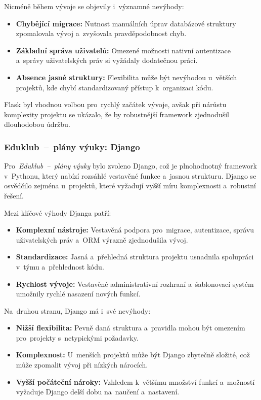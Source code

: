 \documentclass[male,czech,api_bc]{kitheses}
\begin{document}
Nicméně během vývoje se objevily i~významné nevýhody:
\begin{itemize}
	\item \textbf{Chybějící migrace:} Nutnost manuálních úprav databázové struktury zpomalovala vývoj a~zvyšovala pravděpodobnost chyb.
	\item \textbf{Základní správa uživatelů:} Omezené možnosti nativní autentizace a~správy uživatelských práv si vyžádaly dodatečnou práci.
	\item \textbf{Absence jasné struktury:} Flexibilita může být nevýhodou u~větších projektů, kde chybí standardizovaný přístup k~organizaci kódu.
\end{itemize}

Flask byl vhodnou volbou pro~rychlý začátek vývoje, avšak při nárůstu komplexity projektu se ukázalo, že by robustnější framework zjednodušil dlouhodobou údržbu.

\subsubsection{Eduklub~--~plány výuky: Django}

Pro~\textit{Eduklub~--~plány výuky} bylo zvoleno Django, což je plnohodnotný framework v~Pythonu, který nabízí rozsáhlé vestavěné funkce a~jasnou strukturu. Django se osvědčilo zejména u~projektů, které vyžadují vyšší míru komplexnosti a~robustní řešení.

Mezi klíčové výhody Djanga patří:
\begin{itemize}
	\item \textbf{Komplexní nástroje:} Vestavěná podpora pro~migrace, autentizace, správu uživatelských práv a~ORM výrazně zjednodušila vývoj.
	\item \textbf{Standardizace:} Jasná a~přehledná struktura projektu usnadnila spolupráci v~týmu a~přehlednost kódu.
	\item \textbf{Rychlost vývoje:} Vestavěné administrativní rozhraní a~šablonovací systém umožnily rychlé nasazení nových funkcí.
\end{itemize}

Na~druhou stranu, Django má i~své nevýhody:
\begin{itemize}
	\item \textbf{Nižší flexibilita:} Pevně daná struktura a~pravidla mohou být omezením pro~projekty s~netypickými požadavky.
	\item \textbf{Komplexnost:} U~menších projektů může být Django zbytečně složité, což může zpomalit vývoj při nízkých nárocích.
	\item \textbf{Vyšší počáteční nároky:} Vzhledem k~většímu množství funkcí a~možností vyžaduje Django delší dobu na~naučení a~nastavení.
\end{itemize}
\end{document}
